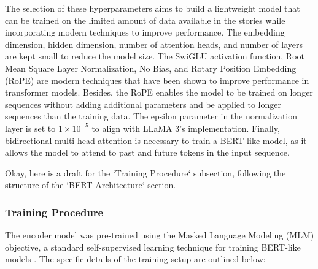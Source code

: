 \documentclass[10pt,letterpaper]{article}
\begin{document}
The selection of these hyperparameters aims to build a lightweight model that can be trained on the limited amount of data available in the stories while incorporating modern techniques to improve performance. The embedding dimension, hidden dimension, number of attention heads, and number of layers are kept small to reduce the model size. The SwiGLU activation function, Root Mean Square Layer Normalization, No Bias, and Rotary Position Embedding (RoPE) are modern techniques that have been shown to improve performance in transformer models. Besides, the RoPE enables the model to be trained on longer sequences without adding additional parameters and be applied to longer sequences than the training data. The epsilon parameter in the normalization layer is set to \(1 \times 10^{-5}\) to align with LLaMA 3's implementation. Finally, bidirectional multi-head attention is necessary to train a BERT-like model, as it allows the model to attend to past and future tokens in the input sequence.

Okay, here is a draft for the `Training Procedure` subsection, following the structure of the `BERT Architecture` section.

\subsubsection{Training Procedure}
The encoder model was pre-trained using the Masked Language Modeling (MLM) objective, a standard self-supervised learning technique for training BERT-like models \cite{devlin2019bert}. The specific details of the training setup are outlined below:
\end{document}
